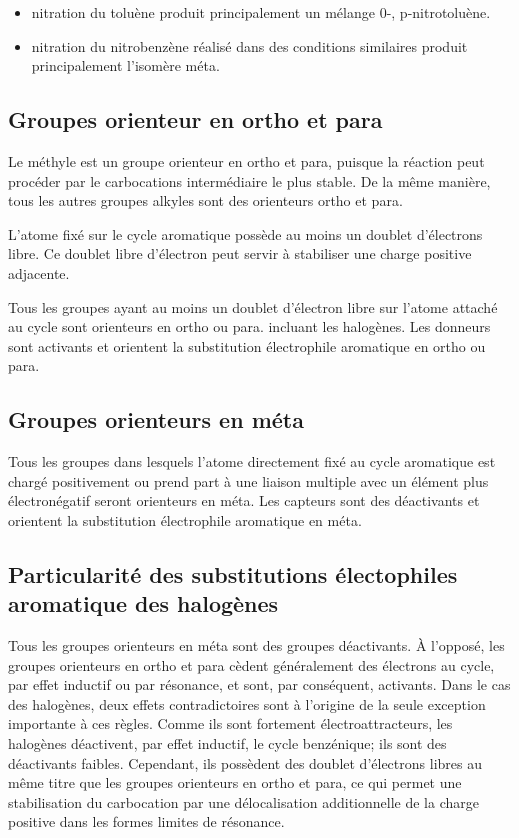 \begin{itemize}
  \item nitration du toluène produit principalement un mélange 0-, p-nitrotoluène.
  \item nitration du nitrobenzène réalisé dans des conditions similaires produit principalement l'isomère méta.
\end{itemize}

\subsection{Groupes orienteur en ortho et para }

Le méthyle est un groupe orienteur en ortho et para, puisque la réaction peut procéder par le carbocations intermédiaire le plus stable.
De la même manière, tous les autres groupes alkyles sont des orienteurs ortho et para.

L'atome fixé sur le cycle aromatique possède au moins un doublet d'électrons libre.
Ce doublet libre d'électron peut servir à stabiliser une charge positive adjacente.

Tous les groupes ayant au moins un doublet d'électron libre sur l'atome attaché au cycle sont orienteurs en ortho ou para.
incluant les halogènes.
Les donneurs sont activants et orientent la substitution électrophile aromatique en ortho ou para.

\subsection{Groupes orienteurs en méta}

Tous les groupes dans lesquels l'atome directement fixé au cycle aromatique est chargé positivement ou prend part à une liaison multiple avec un élément plus électronégatif seront orienteurs en méta.
Les capteurs sont des déactivants et orientent la substitution électrophile aromatique en méta.

\subsection{Particularité des substitutions électophiles aromatique des halogènes}
Tous les groupes orienteurs en méta sont des groupes déactivants.
\`A l'opposé, les groupes orienteurs en ortho et para cèdent généralement des électrons au cycle, par effet inductif ou par résonance, et sont, par conséquent, activants.
Dans le cas des halogènes, deux effets contradictoires sont à l'origine de la seule exception importante à ces règles.
Comme ils sont fortement électroattracteurs, les halogènes déactivent,  par effet inductif, le cycle benzénique; ils sont des déactivants faibles.
Cependant, ils possèdent des doublet d'électrons libres au même titre que les groupes orienteurs en ortho et para, ce qui permet une stabilisation du carbocation par une délocalisation additionnelle de la charge positive dans les formes limites de résonance.



